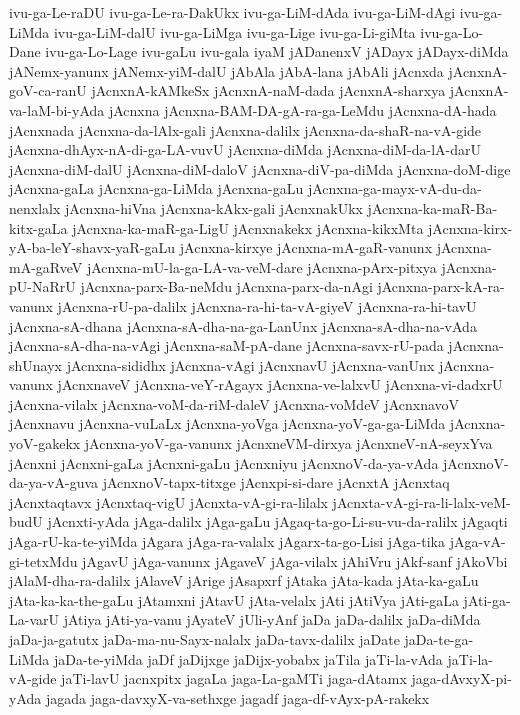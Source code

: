{ivu-ga-Le-raDU
ivu-ga-Le-ra-DakUkx
ivu-ga-LiM-dAda
ivu-ga-LiM-dAgi
ivu-ga-LiMda
ivu-ga-LiM-dalU
ivu-ga-LiMga
ivu-ga-Lige
ivu-ga-Li-giMta
ivu-ga-Lo-Dane
ivu-ga-Lo-Lage
ivu-gaLu
ivu-gala
iyaM
jADanenxV
jADayx
jADayx-diMda
jANemx-yanunx
jANemx-yiM-dalU
jAbAla
jAbA-lana
jAbAli
jAcnxda
jAcnxnA-goV-ca-ranU
jAcnxnA-kAMkeSx
jAcnxnA-naM-dada
jAcnxnA-sharxya
jAcnxnA-va-laM-bi-yAda
jAcnxna
jAcnxna-BAM-DA-gA-ra-ga-LeMdu
jAcnxna-dA-hada
jAcnxnada
jAcnxna-da-lAlx-gali
jAcnxna-dalilx
jAcnxna-da-shaR-na-vA-gide
jAcnxna-dhAyx-nA-di-ga-LA-vuvU
jAcnxna-diMda
jAcnxna-diM-da-lA-darU
jAcnxna-diM-dalU
jAcnxna-diM-daloV
jAcnxna-diV-pa-diMda
jAcnxna-doM-dige
jAcnxna-gaLa
jAcnxna-ga-LiMda
jAcnxna-gaLu
jAcnxna-ga-mayx-vA-du-da-nenxlalx
jAcnxna-hiVna
jAcnxna-kAkx-gali
jAcnxnakUkx
jAcnxna-ka-maR-Ba-kitx-gaLa
jAcnxna-ka-maR-ga-LigU
jAcnxnakekx
jAcnxna-kikxMta
jAcnxna-kirx-yA-ba-leY-shavx-yaR-gaLu
jAcnxna-kirxye
jAcnxna-mA-gaR-vanunx
jAcnxna-mA-gaRveV
jAcnxna-mU-la-ga-LA-va-veM-dare
jAcnxna-pArx-pitxya
jAcnxna-pU-NaRrU
jAcnxna-parx-Ba-neMdu
jAcnxna-parx-da-nAgi
jAcnxna-parx-kA-ra-vanunx
jAcnxna-rU-pa-dalilx
jAcnxna-ra-hi-ta-vA-giyeV
jAcnxna-ra-hi-tavU
jAcnxna-sA-dhana
jAcnxna-sA-dha-na-ga-LanUnx
jAcnxna-sA-dha-na-vAda
jAcnxna-sA-dha-na-vAgi
jAcnxna-saM-pA-dane
jAcnxna-savx-rU-pada
jAcnxna-shUnayx
jAcnxna-sididhx
jAcnxna-vAgi
jAcnxnavU
jAcnxna-vanUnx
jAcnxna-vanunx
jAcnxnaveV
jAcnxna-veY-rAgayx
jAcnxna-ve-lalxvU
jAcnxna-vi-dadxrU
jAcnxna-vilalx
jAcnxna-voM-da-riM-daleV
jAcnxna-voMdeV
jAcnxnavoV
jAcnxnavu
jAcnxna-vuLaLx
jAcnxna-yoVga
jAcnxna-yoV-ga-ga-LiMda
jAcnxna-yoV-gakekx
jAcnxna-yoV-ga-vanunx
jAcnxneVM-dirxya
jAcnxneV-nA-seyxYva
jAcnxni
jAcnxni-gaLa
jAcnxni-gaLu
jAcnxniyu
jAcnxnoV-da-ya-vAda
jAcnxnoV-da-ya-vA-guva
jAcnxnoV-tapx-titxge
jAcnxpi-si-dare
jAcnxtA
jAcnxtaq
jAcnxtaqtavx
jAcnxtaq-vigU
jAcnxta-vA-gi-ra-lilalx
jAcnxta-vA-gi-ra-li-lalx-veM-budU
jAcnxti-yAda
jAga-dalilx
jAga-gaLu
jAgaq-ta-go-Li-su-vu-da-ralilx
jAgaqti
jAga-rU-ka-te-yiMda
jAgara
jAga-ra-valalx
jAgarx-ta-go-Lisi
jAga-tika
jAga-vA-gi-tetxMdu
jAgavU
jAga-vanunx
jAgaveV
jAga-vilalx
jAhiVru
jAkf-sanf
jAkoVbi
jAlaM-dha-ra-dalilx
jAlaveV
jArige
jAsapxrf
jAtaka
jAta-kada
jAta-ka-gaLu
jAta-ka-ka-the-gaLu
jAtamxni
jAtavU
jAta-velalx
jAti
jAtiVya
jAti-gaLa
jAti-ga-La-varU
jAtiya
jAti-ya-vanu
jAyateV
jUli-yAnf
jaDa
jaDa-dalilx
jaDa-diMda
jaDa-ja-gatutx
jaDa-ma-nu-Sayx-nalalx
jaDa-tavx-dalilx
jaDate
jaDa-te-ga-LiMda
jaDa-te-yiMda
jaDf
jaDijxge
jaDijx-yobabx
jaTila
jaTi-la-vAda
jaTi-la-vA-gide
jaTi-lavU
jacnxpitx
jagaLa
jaga-La-gaMTi
jaga-dAtamx
jaga-dAvxyX-pi-yAda
jagada
jaga-davxyX-va-sethxge
jagadf
jaga-df-vAyx-pA-rakekx
}
